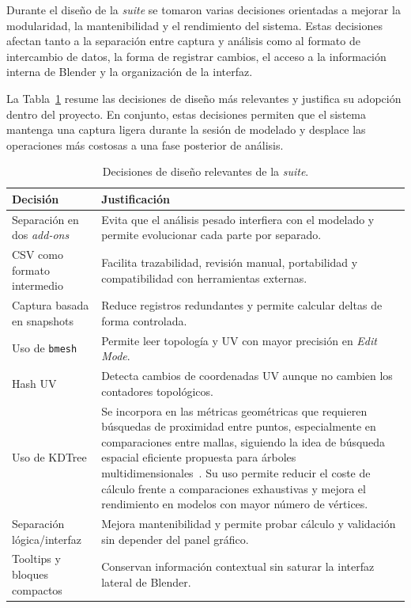 Durante el diseño de la \textit{suite} se tomaron varias decisiones orientadas a mejorar la modularidad, la mantenibilidad y el rendimiento del sistema. Estas decisiones afectan tanto a la separación entre captura y análisis como al formato de intercambio de datos, la forma de registrar cambios, el acceso a la información interna de Blender y la organización de la interfaz.

La Tabla~\ref{tab:c-decisiones-diseno} resume las decisiones de diseño más relevantes y justifica su adopción dentro del proyecto. En conjunto, estas decisiones permiten que el sistema mantenga una captura ligera durante la sesión de modelado y desplace las operaciones más costosas a una fase posterior de análisis.

\begin{table}[H]
\centering
\scriptsize
\renewcommand{\arraystretch}{1.15}
\begin{tabularx}{\textwidth}{p{4cm}X}
\toprule
\textbf{Decisión} & \textbf{Justificación} \\
\midrule
Separación en dos \textit{add-ons} & Evita que el análisis pesado interfiera con el modelado y permite evolucionar cada parte por separado. \\
CSV como formato intermedio & Facilita trazabilidad, revisión manual, portabilidad y compatibilidad con herramientas externas. \\
Captura basada en snapshots & Reduce registros redundantes y permite calcular deltas de forma controlada. \\
Uso de \texttt{bmesh} & Permite leer topología y UV con mayor precisión en \textit{Edit Mode}. \\
Hash UV & Detecta cambios de coordenadas UV aunque no cambien los contadores topológicos. \\
Uso de KDTree & Se incorpora en las métricas geométricas que requieren búsquedas de proximidad entre puntos, especialmente en comparaciones entre mallas, siguiendo la idea de búsqueda espacial eficiente propuesta para árboles multidimensionales~\cite{bentley1975kdtree}. Su uso permite reducir el coste de cálculo frente a comparaciones exhaustivas y mejora el rendimiento en modelos con mayor número de vértices. \\
Separación lógica/interfaz & Mejora mantenibilidad y permite probar cálculo y validación sin depender del panel gráfico. \\
Tooltips y bloques compactos & Conservan información contextual sin saturar la interfaz lateral de Blender. \\
\bottomrule
\end{tabularx}
\caption{Decisiones de diseño relevantes de la \textit{suite}.}
\label{tab:c-decisiones-diseno}
\end{table}